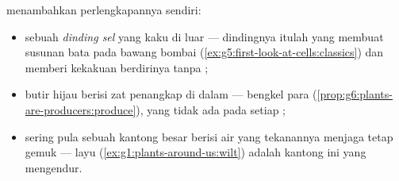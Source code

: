 \begin{proposition}\label{prop:g6:cell-unit-of-life:plantextras}
  menambahkan perlengkapannya sendiri:
\begin{itemize}
  \item sebuah \emph{dinding sel} yang kaku di luar
         --- dindingnya itulah yang membuat susunan bata
        pada  bawang bombai
        (\cref{ex:g5:first-look-at-cells:classics}) dan memberi
         kekakuan berdirinya tanpa ;
  \item butir hijau berisi zat penangkap  di dalam 
        --- bengkel para 
        (\cref{prop:g6:plants-are-producers:produce}), yang tidak ada
        pada setiap  ;
  \item sering pula sebuah kantong besar berisi air yang tekanannya
        menjaga  tetap gemuk --- layu
        (\cref{ex:g1:plants-around-us:wilt}) adalah kantong ini yang
        mengendur.
\end{itemize}
\end{proposition}
\admitted

